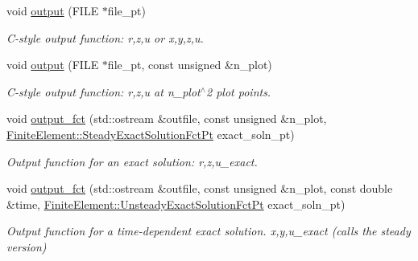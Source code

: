 \begin{DoxyCompactItemize}
void \hyperlink{classoomph_1_1TPMLFourierDecomposedHelmholtzElement_a9fa5832723310e96902398d74e43313f}{output} (F\+I\+LE $\ast$file\+\_\+pt)
\begin{DoxyCompactList}\small\item\em C-\/style output function\+: r,z,u or x,y,z,u. \end{DoxyCompactList}\item 
void \hyperlink{classoomph_1_1TPMLFourierDecomposedHelmholtzElement_aec6440de61dd7cd76b77ddd7732744d4}{output} (F\+I\+LE $\ast$file\+\_\+pt, const unsigned \&n\+\_\+plot)
\begin{DoxyCompactList}\small\item\em C-\/style output function\+: r,z,u at n\+\_\+plot$^\wedge$2 plot points. \end{DoxyCompactList}\item 
void \hyperlink{classoomph_1_1TPMLFourierDecomposedHelmholtzElement_a8d10df8873643287fa87842e34e3b898}{output\+\_\+fct} (std\+::ostream \&outfile, const unsigned \&n\+\_\+plot, \hyperlink{classoomph_1_1FiniteElement_a690fd33af26cc3e84f39bba6d5a85202}{Finite\+Element\+::\+Steady\+Exact\+Solution\+Fct\+Pt} exact\+\_\+soln\+\_\+pt)
\begin{DoxyCompactList}\small\item\em Output function for an exact solution\+: r,z,u\+\_\+exact. \end{DoxyCompactList}\item 
void \hyperlink{classoomph_1_1TPMLFourierDecomposedHelmholtzElement_a72f800e47f97fbbf21bf108e0fa5e39b}{output\+\_\+fct} (std\+::ostream \&outfile, const unsigned \&n\+\_\+plot, const double \&time, \hyperlink{classoomph_1_1FiniteElement_ad4ecf2b61b158a4b4d351a60d23c633e}{Finite\+Element\+::\+Unsteady\+Exact\+Solution\+Fct\+Pt} exact\+\_\+soln\+\_\+pt)
\begin{DoxyCompactList}\small\item\em Output function for a time-\/dependent exact solution. x,y,u\+\_\+exact (calls the steady version) \end{DoxyCompactList}\end{DoxyCompactItemize}
